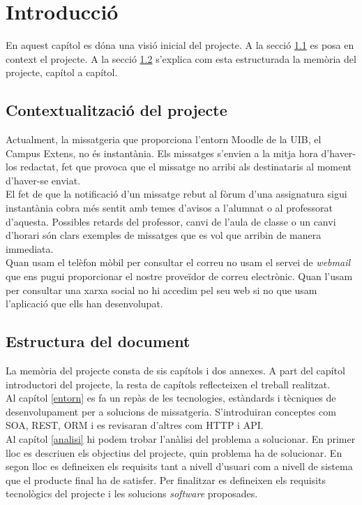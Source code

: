 \chapter{Introducció}
En aquest capítol es dóna una visió inicial del projecte. A la secció \ref{contexte} es posa en context el projecte. A la secció \ref{estructura_document} s'explica com esta estructurada la memòria del projecte, capítol a capítol.

\section{Contextualització del projecte}\label{contexte}
Actualment, la missatgeria que proporciona l'entorn Moodle de la \ac{UIB}, el Campus Extens, no és instantània. Els missatges s'envien a la mitja hora d'haver-los redactat, fet que provoca que el missatge no arribi als destinataris al moment d'haver-se enviat. \\

El fet de que la notificació d'un missatge rebut al fòrum d'una assignatura sigui instantània cobra més sentit amb temes d'avisos a l'alumnat o al professorat d'aquesta. Possibles retards del professor, canvi de l'aula de classe o un canvi d'horari són clars exemples de missatges que es vol que arribin de manera immediata.\\

Quan usam el telèfon mòbil per consultar el correu no usam el servei de \emph{webmail} que ens pugui proporcionar el nostre proveïdor de correu electrònic. Quan l'usam per consultar una xarxa social no hi accedim pel seu web si no que usam l'aplicació que ells han desenvolupat. 

 
\section{Estructura del document}\label{estructura_document}
La memòria del projecte consta de sis capítols i dos annexes. A part del capítol introductori del projecte, la resta de capítols reflecteixen el treball realitzat.\\

Al capítol \ref{entorn} es fa un repàs de les tecnologies, estàndards i tècniques de desenvolupament per a solucions de missatgeria. S'introduiran conceptes com \ac{SOA}, \ac{REST}, \ac{ORM} i es revisaran d'altres com \ac{HTTP} i \ac{API}.\\

Al capítol \ref{analisi} hi podem trobar l'anàlisi del problema a solucionar. En primer lloc es descriuen els objectius del projecte, quin problema ha de solucionar. En segon lloc es defineixen els requisits tant a nivell d'usuari com a nivell de sistema que el producte final ha de satisfer. Per finalitzar es defineixen els requisits tecnològics del projecte i les solucions \emph{software} proposades.\\

